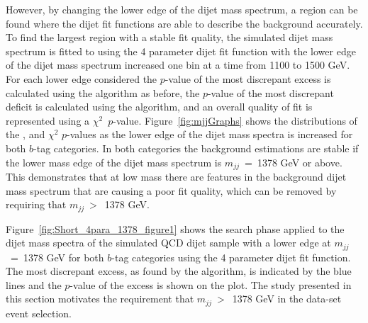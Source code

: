 
However, by changing the lower edge of the dijet mass spectrum,
a region can be found where the dijet fit functions are able to describe the background accurately.
To find the largest region with a stable fit quality, the simulated dijet mass spectrum is
fitted to using the 4 parameter dijet fit function with the lower edge of the dijet mass spectrum increased one bin at a time from 1100 to 1500 GeV.
For each lower edge considered
the \mbox{$p$-value} of the most discrepant excess is calculated using the \bh{} algorithm as before,
the \mbox{$p$-value} of the most discrepant deficit is calculated using the \dhunt{} algorithm,
and an overall quality of fit is represented using a $\chi^{2}$~\mbox{$p$-value}.
Figure~\ref{fig:mjjGraphs} shows the distributions of the
\bh{}, \dhunt{} and $\chi^{2}$ \mbox{$p$-value}s as the lower edge of the dijet mass spectra is increased
for both $b$-tag categories.
In both categories the background estimations are stable if the lower mass edge of the dijet mass spectrum is $m_{jj}$~=~1378 GeV or above.
This demonstrates that at low mass there are features in the background dijet mass spectrum that are causing a poor fit quality,
which can be removed by requiring that $m_{jj}~>$~1378 GeV. 

Figure~\ref{fig:Short_4para_1378_figure1} shows the search phase applied to the dijet mass spectra
of the simulated QCD dijet sample with a lower edge at $m_{jj}$~=~1378 GeV for both $b$-tag categories
 using the 4 parameter dijet fit function.
The most discrepant excess, as found by the \bh{} algorithm, is indicated by the blue lines
and the \mbox{$p$-value} of the excess is shown on the plot.
The study presented in this section motivates the requirement that $m_{jj}~>$~1378 GeV in the \summer{} data-set event selection.


